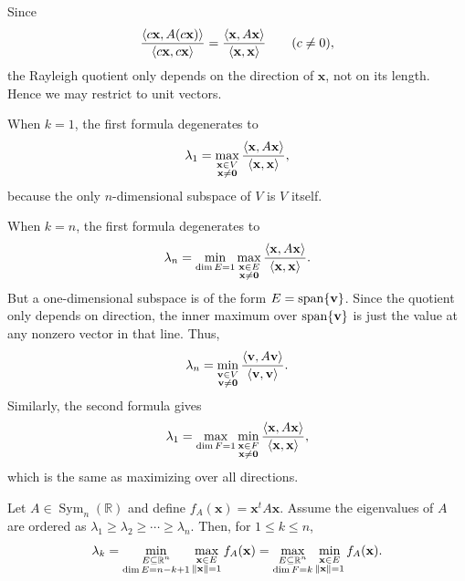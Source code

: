 \begin{remark}
Since
\[
    \frac{\left\langle c\mathbf{x}, A(c\mathbf{x}) \right\rangle}
         {\left\langle c\mathbf{x}, c\mathbf{x} \right\rangle}
    =
    \frac{\left\langle \mathbf{x}, A\mathbf{x} \right\rangle}
         {\left\langle \mathbf{x}, \mathbf{x} \right\rangle}
    \qquad (c\neq 0),
\]
the Rayleigh quotient only depends on the direction of $\mathbf{x}$, not on
its length. Hence we may restrict to unit vectors.

When $k=1$, the first formula degenerates to
\[
    \lambda_1
    =
    \max_{\substack{\mathbf{x}\in V\\ \mathbf{x}\neq \mathbf{0}}}
    \frac{\left\langle \mathbf{x}, A\mathbf{x} \right\rangle}
         {\left\langle \mathbf{x}, \mathbf{x} \right\rangle},
\]
because the only $n$-dimensional subspace of $V$ is $V$ itself.

When $k=n$, the first formula degenerates to
\[
    \lambda_n
    =
    \min_{\substack{\dim E=1}}
    \max_{\substack{\mathbf{x}\in E\\ \mathbf{x}\neq \mathbf{0}}}
    \frac{\left\langle \mathbf{x}, A\mathbf{x} \right\rangle}
         {\left\langle \mathbf{x}, \mathbf{x} \right\rangle}.
\]
But a one-dimensional subspace is of the form $E=\operatorname{span}\{\mathbf{v}\}$.
Since the quotient only depends on direction, the inner maximum over
$\operatorname{span}\{\mathbf{v}\}$ is just the value at any nonzero vector in that line.
Thus,
\[
    \lambda_n
    =
    \min_{\substack{\mathbf{v}\in V\\ \mathbf{v}\neq \mathbf{0}}}
    \frac{\left\langle \mathbf{v}, A\mathbf{v} \right\rangle}
         {\left\langle \mathbf{v}, \mathbf{v} \right\rangle}.
\]
Similarly, the second formula gives
\[
    \lambda_1
    =
    \max_{\substack{\dim F=1}}
    \min_{\substack{\mathbf{x}\in F\\ \mathbf{x}\neq \mathbf{0}}}
    \frac{\left\langle \mathbf{x}, A\mathbf{x} \right\rangle}
         {\left\langle \mathbf{x}, \mathbf{x} \right\rangle},
\]
which is the same as maximizing over all directions.
\end{remark}


\begin{corollary}
Let $A\in \operatorname{Sym}_n(\mathbb{R})$ and define $f_A(\mathbf{x})=\mathbf{x}^tA\mathbf{x}$.
Assume the eigenvalues of $A$ are ordered as $\lambda_1\ge \lambda_2\ge \cdots \ge \lambda_n$.
Then, for $1\le k\le n$,
\[
    \lambda_k
    =
    \min_{\substack{E\subseteq \mathbb{R}^n\\ \dim E=n-k+1}}
    \max_{\substack{\mathbf{x}\in E\\ \left\lVert \mathbf{x} \right\rVert=1}}
    f_A(\mathbf{x})
    =
    \max_{\substack{E\subseteq \mathbb{R}^n\\ \dim F=k}}
    \min_{\substack{\mathbf{x}\in E\\ \left\lVert \mathbf{x} \right\rVert=1}}
    f_A(\mathbf{x}).
\]
\end{corollary}

